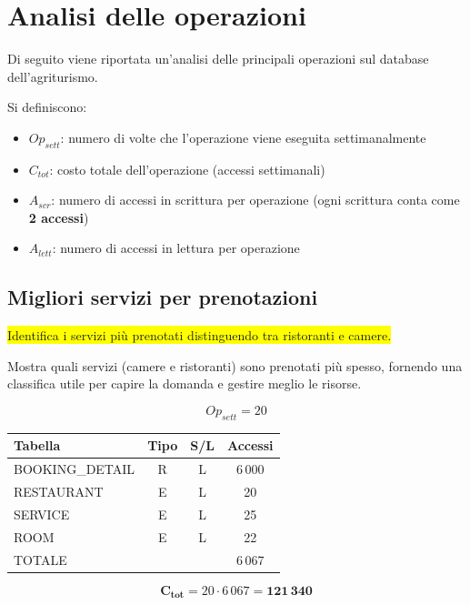 \documentclass[a4paper,12pt]{report}
\begin{document}
\section{Analisi delle operazioni}
Di seguito viene riportata un'analisi delle principali operazioni
sul database dell'agriturismo.

Si definiscono:
\begin{itemize}
  \item $Op_{sett}$: numero di volte che l'operazione viene eseguita
    settimanalmente
  \item $C_{tot}$: costo totale dell'operazione (accessi settimanali)
  \item $A_{scr}$: numero di accessi in scrittura per operazione
    (ogni scrittura conta come \textbf{2 accessi})
  \item $A_{lett}$: numero di accessi in lettura per operazione
\end{itemize}

\newpage
\subsection*{Migliori servizi per prenotazioni} \label{op1}
\colorbox{yellow}{Identifica i servizi più prenotati distinguendo tra
ristoranti e camere.}

Mostra quali servizi (camere e ristoranti) sono
prenotati più spesso, fornendo una classifica utile per capire la
domanda e gestire meglio le risorse.

$$Op_{sett} = 20$$

\begin{table}[H]
  \centering
  \small
  \renewcommand{\arraystretch}{1.15}
  \begin{tabularx}{0.7\textwidth}{|X|c|c|c|}
    \hline
    \rowcolor{gray!20}
    \textbf{Tabella} & \textbf{Tipo} & \textbf{S/L} & \textbf{Accessi} \\
    \hline
    BOOKING\_DETAIL & R & L & 6\,000 \\
    RESTAURANT & E & L & 20 \\
    SERVICE & E & L & 25 \\
    ROOM & E & L & 22 \\
    \hline
    \rowcolor{gray!20}
    TOTALE & & & 6\,067 \\
    \hline
  \end{tabularx}
  \vspace{-1em}
\end{table}

$$\mathbf{C_{tot}} = 20 \cdot 6\,067 = \mathbf{121\,340}$$
\end{document}
